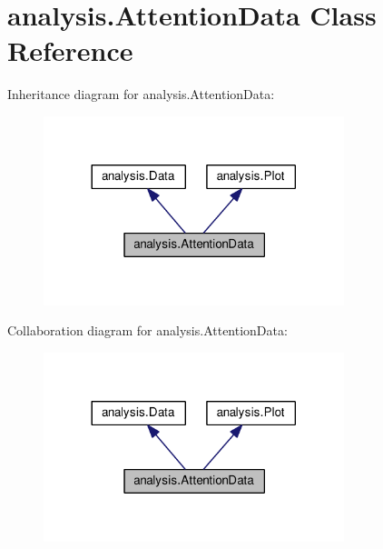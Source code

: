 \hypertarget{classanalysis_1_1AttentionData}{}\section{analysis.\+Attention\+Data Class Reference}
\label{classanalysis_1_1AttentionData}


Inheritance diagram for analysis.\+Attention\+Data\+:
\nopagebreak
\begin{figure}[H]
\begin{center}
\leavevmode
\includegraphics[width=248pt]{classanalysis_1_1AttentionData__inherit__graph}
\end{center}
\end{figure}


Collaboration diagram for analysis.\+Attention\+Data\+:
\nopagebreak
\begin{figure}[H]
\begin{center}
\leavevmode
\includegraphics[width=248pt]{classanalysis_1_1AttentionData__coll__graph}
\end{center}
\end{figure}

